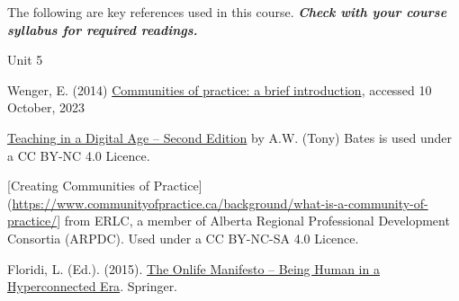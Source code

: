 \documentclass[
]{book}
\theoremstyle{definition}
\theoremstyle{definition}
\theoremstyle{definition}
\theoremstyle{definition}
\theoremstyle{remark}
\begin{document}
The following are key references used in this course. \textbf{\emph{Check with your course syllabus for required readings.}}

Unit 5

Wenger, E. (2014) \href{https://www.wenger-trayner.com/introduction-to-communities-of-practice/}{Communities of practice: a brief introduction}, accessed 10 October, 2023

\href{https://pressbooks.bccampus.ca/teachinginadigitalagev2/}{Teaching in a Digital Age -- Second Edition} by A.W. (Tony) Bates is used under a CC BY-NC 4.0 Licence.

{[}Creating Communities of Practice{]}(\url{https://www.communityofpractice.ca/background/what-is-a-community-of-practice/}{]} from ERLC, a member of Alberta Regional Professional Development Consortia (ARPDC). Used under a CC BY-NC-SA 4.0 Licence.

Floridi, L. (Ed.). (2015). \href{https://link.springer.com/book/10.1007/978-3-319-04093-6}{The Onlife Manifesto -- Being Human in a Hyperconnected Era}. Springer.

  
\end{document}
